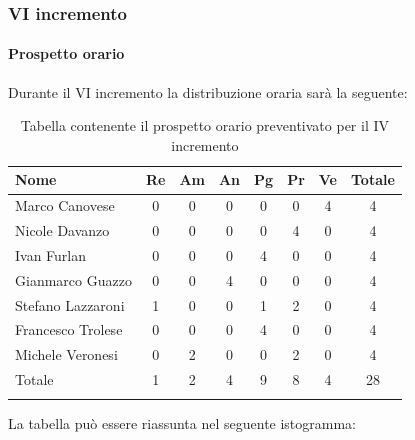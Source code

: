 \subsubsection{VI incremento}
\paragraph{Prospetto orario}
Durante il VI incremento la distribuzione oraria sarà la seguente:

\begin{longtable}{|l|c|c|c|c|c|c|c|}
	\hline
	\rowcolor{lighter-grayer}
	\textbf{Nome}     & \textbf{Re} & \textbf{Am} & \textbf{An} & \textbf{Pg} & \textbf{Pr} & \textbf{Ve} & \textbf{Totale} \\
	\hline
	\endfirsthead

	\hline
	Marco Canovese    & 0           & 0           & 0           & 0           & 0           & 4           & 4               \\
	\hline
	\hline
	Nicole Davanzo    & 0           & 0           & 0           & 0           & 4           & 0           & 4               \\
	\hline
	\hline
	Ivan Furlan       & 0           & 0           & 0           & 4           & 0           & 0           & 4               \\
	\hline
	\hline
	Gianmarco Guazzo  & 0           & 0           & 4           & 0           & 0           & 0           & 4               \\
	\hline
	\hline
	Stefano Lazzaroni & 1           & 0           & 0           & 1           & 2           & 0           & 4               \\
	\hline
	\hline
	Francesco Trolese & 0           & 0           & 0           & 4           & 0           & 0           & 4               \\
	\hline
	\hline
	Michele Veronesi  & 0           & 2           & 0           & 0           & 2           & 0           & 4               \\
	\hline
	\hline
	Totale            & 1           & 2           & 4          & 9           & 8           & 4          & 28              \\
	\hline
	\rowcolor{white}
	\caption{Tabella contenente il prospetto orario preventivato per il IV incremento}
\end{longtable}


La tabella può essere riassunta nel seguente istogramma:

